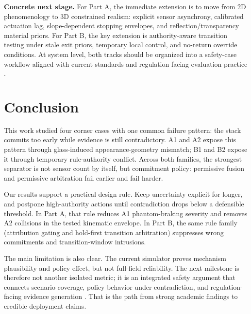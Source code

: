 \documentclass[sigconf,nonacm]{acmart}
\begin{document}
\textbf{Concrete next stage.}
For Part A, the immediate extension is to move from 2D phenomenology to 3D constrained realism: explicit sensor asynchrony, calibrated actuation lag, slope-dependent stopping envelopes, and reflection/transparency material priors. For Part B, the key extension is authority-aware transition testing under stale exit priors, temporary local control, and no-return override conditions. At system level, both tracks should be organized into a safety-case workflow aligned with current standards and regulation-facing evaluation practice \cite{ul4600,unr157}.

\section{Conclusion}

This work studied four corner cases with one common failure pattern: the stack commits too early while evidence is still contradictory. A1 and A2 expose this pattern through glass-induced appearance-geometry mismatch; B1 and B2 expose it through temporary rule-authority conflict. Across both families, the strongest separator is not sensor count by itself, but commitment policy: permissive fusion and permissive arbitration fail earlier and fail harder.

Our results support a practical design rule. Keep uncertainty explicit for longer, and postpone high-authority actions until contradiction drops below a defensible threshold. In Part A, that rule reduces A1 phantom-braking severity and removes A2 collisions in the tested kinematic envelope. In Part B, the same rule family (attribution gating and hold-first transition arbitration) suppresses wrong commitments and transition-window intrusions.

The main limitation is also clear. The current simulator proves mechanism plausibility and policy effect, but not full-field reliability. The next milestone is therefore not another isolated metric; it is an integrated safety argument that connects scenario coverage, policy behavior under contradiction, and regulation-facing evidence generation \cite{iso21448,ul4600,unr157}. That is the path from strong academic findings to credible deployment claims.
\end{document}
